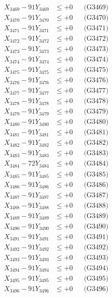 \documentclass[a4paper,10pt]{article}
\begin{document}
{\begin{align}
X_{3469} - 91Y_{3469} &\leq +0 && \text{(G3469)} \\
X_{3470} - 91Y_{3470} &\leq +0 && \text{(G3470)} \\
\allowbreak
X_{3471} - 91Y_{3471} &\leq +0 && \text{(G3471)} \\
X_{3472} - 91Y_{3472} &\leq +0 && \text{(G3472)} \\
X_{3473} - 91Y_{3473} &\leq +0 && \text{(G3473)} \\
X_{3474} - 91Y_{3474} &\leq +0 && \text{(G3474)} \\
X_{3475} - 91Y_{3475} &\leq +0 && \text{(G3475)} \\
X_{3476} - 91Y_{3476} &\leq +0 && \text{(G3476)} \\
X_{3477} - 91Y_{3477} &\leq +0 && \text{(G3477)} \\
X_{3478} - 91Y_{3478} &\leq +0 && \text{(G3478)} \\
X_{3479} - 91Y_{3479} &\leq +0 && \text{(G3479)} \\
X_{3480} - 91Y_{3480} &\leq +0 && \text{(G3480)} \\
\allowbreak
X_{3481} - 91Y_{3481} &\leq +0 && \text{(G3481)} \\
X_{3482} - 91Y_{3482} &\leq +0 && \text{(G3482)} \\
X_{3483} - 91Y_{3483} &\leq +0 && \text{(G3483)} \\
X_{3484} - 72Y_{3484} &\leq +0 && \text{(G3484)} \\
X_{3485} - 91Y_{3485} &\leq +0 && \text{(G3485)} \\
X_{3486} - 91Y_{3486} &\leq +0 && \text{(G3486)} \\
X_{3487} - 91Y_{3487} &\leq +0 && \text{(G3487)} \\
X_{3488} - 91Y_{3488} &\leq +0 && \text{(G3488)} \\
X_{3489} - 91Y_{3489} &\leq +0 && \text{(G3489)} \\
X_{3490} - 91Y_{3490} &\leq +0 && \text{(G3490)} \\
\allowbreak
X_{3491} - 91Y_{3491} &\leq +0 && \text{(G3491)} \\
X_{3492} - 91Y_{3492} &\leq +0 && \text{(G3492)} \\
X_{3493} - 91Y_{3493} &\leq +0 && \text{(G3493)} \\
X_{3494} - 91Y_{3494} &\leq +0 && \text{(G3494)} \\
X_{3495} - 91Y_{3495} &\leq +0 && \text{(G3495)} \\
X_{3496} - 91Y_{3496} &\leq +0 && \text{(G3496)} \\

\end{align}}
\end{document}
